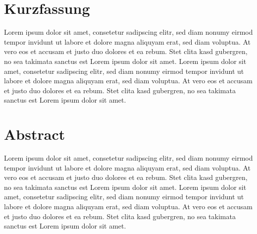  
\section*{Kurzfassung}
Lorem ipsum dolor sit amet, consetetur sadipscing elitr, sed diam nonumy eirmod tempor invidunt ut labore et dolore magna aliquyam erat, 
sed 
diam voluptua. At vero eos et accusam et justo duo dolores et ea rebum. Stet clita kasd gubergren, no sea takimata sanctus est Lorem ipsum 
dolor sit amet. Lorem ipsum dolor sit amet, consetetur sadipscing elitr, sed diam nonumy eirmod tempor invidunt ut labore et dolore magna 
aliquyam erat, sed diam voluptua. At vero eos et accusam et justo duo dolores et ea rebum. Stet clita kasd gubergren, no sea takimata 
sanctus est Lorem ipsum dolor sit amet.


\section*{Abstract}
Lorem ipsum dolor sit amet, consetetur sadipscing elitr, sed diam nonumy eirmod tempor invidunt ut labore et dolore magna aliquyam erat, 
sed 
diam voluptua. At vero eos et accusam et justo duo dolores et ea rebum. Stet clita kasd gubergren, no sea takimata sanctus est Lorem ipsum 
dolor sit amet. Lorem ipsum dolor sit amet, consetetur sadipscing elitr, sed diam nonumy eirmod tempor invidunt ut labore et dolore magna 
aliquyam erat, sed diam voluptua. At vero eos et accusam et justo duo dolores et ea rebum. Stet clita kasd gubergren, no sea takimata 
sanctus est Lorem ipsum dolor sit amet.

